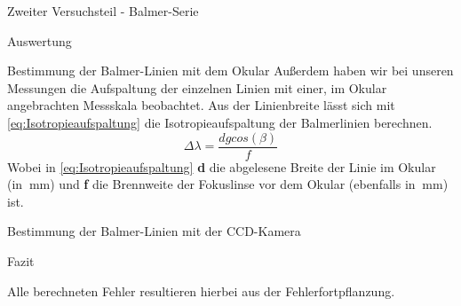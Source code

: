 \documentclass[pdftex, a4paper,11pt, twoside, ngerman]{report}
\begin{document}
\begin{chapter}{Zweiter Versuchsteil - Balmer-Serie}
\begin{section}{Auswertung}
\begin{subsection}{Bestimmung der Balmer-Linien mit dem Okular}
        Außerdem haben wir bei unseren Messungen die Aufspaltung der einzelnen 
        Linien mit einer, im Okular angebrachten Messskala beobachtet. Aus der 
        Linienbreite lässt sich mit \cref{eq:Isotropieaufspaltung} die 
        Isotropieaufspaltung der Balmerlinien berechnen.
        \begin{equation}
          \label{eq:Isotropieaufspaltung}
          \Delta\lambda=\frac{dgcos(\beta)}{f}
        \end{equation}
        Wobei in \cref{eq:Isotropieaufspaltung} \textbf{d} die abgelesene 
        Breite der Linie im Okular (in $\SI{}{\milli\meter}$) und \textbf{f} 
        die Brennweite der Fokuslinse vor dem Okular (ebenfalls in 
        $\SI{}{\milli\meter}$) ist.
        
      \end{subsection}
      
      
      
      \begin{subsection}{Bestimmung der Balmer-Linien mit der CCD-Kamera}
        \label{chp:Balmer:sec:Auswertung:subsec:CCD}
        
        
      \end{subsection}
      
    \end{section}
   
   
   
    \begin{section}{Fazit}
      \label{chp:Balmer:sec:Fazit}
      
      
      Alle berechneten Fehler resultieren hierbei aus der Fehlerfortpflanzung.
      
    \end{section}
   
  \end{chapter}
  
\end{document}
